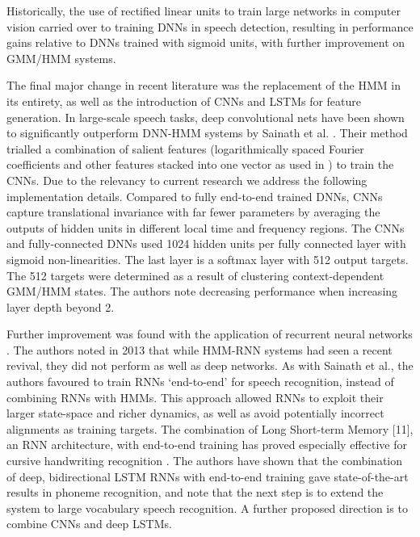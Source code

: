 \documentclass[12pt]{llncs}
\newcommand{\ikn}[1]{\todo[size = \small, color=orange!30]{[ik] #1}}
\begin{document}
Historically, the use of rectified linear units to train large networks in computer vision carried over to training DNNs in speech detection, resulting in performance gains relative to DNNs trained with sigmoid units, with further improvement on GMM/HMM systems. \cite{dahl2013improving}




The final major change in recent literature was the replacement of the HMM in its entirety, as well as the introduction of CNNs and LSTMs for feature generation.
In large-scale speech tasks, deep convolutional nets have been shown to significantly outperform DNN-HMM systems by Sainath et al. \cite{sainath2015deep}. Their method trialled a combination of salient features (logarithmically spaced Fourier coefficients and other features stacked into one vector as used in \cite{soltau2010ibm}) to train the CNNs. Due to the relevancy to current research \ikn{Re-word} we address the following implementation details. Compared to fully end-to-end trained DNNs\ikn{Check claim}, CNNs capture translational invariance with far fewer parameters by averaging the outputs of hidden units in different local time and frequency regions. The CNNs and fully-connected DNNs used 1024 hidden units per fully connected layer with sigmoid non-linearities. The last layer is a softmax layer with 512 output targets. The 512 targets were determined as a result of clustering context-dependent GMM/HMM states. The authors note decreasing performance when increasing layer depth beyond 2. 
	
 


Further improvement was found with the application of recurrent neural networks \cite{graves2013speech}. The authors noted in 2013 that while HMM-RNN systems had seen a recent revival, they did not perform as well as deep networks. As with Sainath et al., the authors favoured to train RNNs ‘end-to-end’ for speech recognition, instead of combining RNNs with HMMs. This approach allowed RNNs to exploit their larger state-space and richer dynamics, as well as avoid potentially incorrect alignments as training targets. The combination of Long Short-term Memory [11], an RNN architecture, with end-to-end training has proved especially effective for cursive handwriting recognition \cite{graves2008unconstrained,graves2009offline}. The authors have shown that the combination of deep, bidirectional LSTM RNNs with end-to-end training gave state-of-the-art results in phoneme recognition, and note that the next step is to extend the system to large vocabulary speech recognition. A further proposed direction is to combine CNNs and deep LSTMs.
\end{document}
